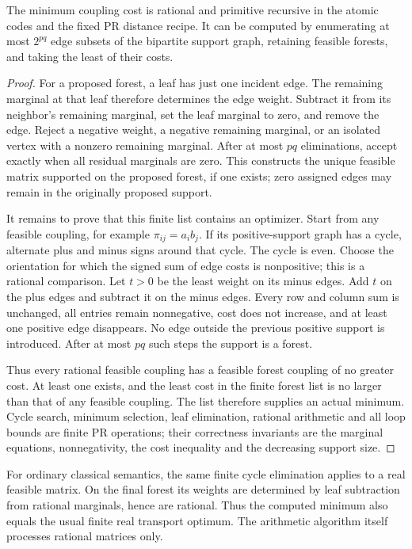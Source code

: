 \begin{lemma}\label{lem:transport-forest}
The minimum coupling cost is rational and primitive recursive in the
atomic codes and the fixed PR distance recipe.  It can be computed by
enumerating at most \(2^{pq}\) edge subsets of the bipartite support graph,
retaining feasible forests, and taking the least of their costs.
\end{lemma}
\begin{proof}
For a proposed forest, a leaf has just one incident edge.  The remaining
marginal at that leaf therefore determines the edge weight.  Subtract it
from its neighbor's remaining marginal, set the leaf marginal to zero,
and remove the edge.  Reject a negative weight, a negative remaining
marginal, or an isolated vertex with a nonzero remaining marginal.
After at most \(pq\) eliminations, accept exactly when all residual
marginals are zero.  This constructs the unique feasible matrix supported
on the proposed forest, if one exists; zero assigned edges may remain in
the originally proposed support.

It remains to prove that this finite list contains an optimizer.  Start
from any feasible coupling, for example \(\pi_{ij}=a_ib_j\).  If its
positive-support graph has a cycle, alternate plus and minus signs around
that cycle.  The cycle is even.  Choose the orientation for which the
signed sum of edge costs is nonpositive; this is a rational comparison.
Let \(t>0\) be the least weight on its minus edges.  Add \(t\) on the
plus edges and subtract it on the minus edges.  Every row and column sum
is unchanged, all entries remain nonnegative, cost does not increase,
and at least one positive edge disappears.  No edge outside the previous
positive support is introduced.  After at most \(pq\) such steps the
support is a forest.

Thus every rational feasible coupling has a feasible forest coupling of
no greater cost.  At least one exists, and the least cost in the finite
forest list is no larger than that of any feasible coupling.  The list
therefore supplies an actual minimum.  Cycle search, minimum selection,
leaf elimination, rational arithmetic and all loop bounds are finite PR
operations; their correctness invariants are the marginal equations,
nonnegativity, the cost inequality and the decreasing support size.
\end{proof}

For ordinary classical semantics, the same finite cycle elimination applies
to a real feasible matrix.  On the final forest its weights are determined
by leaf subtraction from rational marginals, hence are rational.  Thus the
computed minimum also equals the usual finite real transport optimum.
The arithmetic algorithm itself processes rational matrices only.

